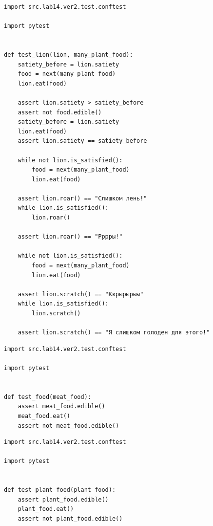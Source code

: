 \documentclass[a4paper,14pt]{extarticle}
\begin{document}
\begin{verbatim}
import src.lab14.ver2.test.conftest

import pytest


def test_lion(lion, many_plant_food):
    satiety_before = lion.satiety
    food = next(many_plant_food)
    lion.eat(food)

    assert lion.satiety > satiety_before
    assert not food.edible()
    satiety_before = lion.satiety
    lion.eat(food)
    assert lion.satiety == satiety_before

    while not lion.is_satisfied():
        food = next(many_plant_food)
        lion.eat(food)

    assert lion.roar() == "Слишком лень!"
    while lion.is_satisfied():
        lion.roar()

    assert lion.roar() == "Рррры!"

    while not lion.is_satisfied():
        food = next(many_plant_food)
        lion.eat(food)

    assert lion.scratch() == "Ккрырырыы"
    while lion.is_satisfied():
        lion.scratch()

    assert lion.scratch() == "Я слишком голоден для этого!"

\end{verbatim}
\begin{verbatim}
import src.lab14.ver2.test.conftest

import pytest


def test_food(meat_food):
    assert meat_food.edible()
    meat_food.eat()
    assert not meat_food.edible()

\end{verbatim}
\begin{verbatim}
import src.lab14.ver2.test.conftest

import pytest


def test_plant_food(plant_food):
    assert plant_food.edible()
    plant_food.eat()
    assert not plant_food.edible()


\end{verbatim}
\end{document}

